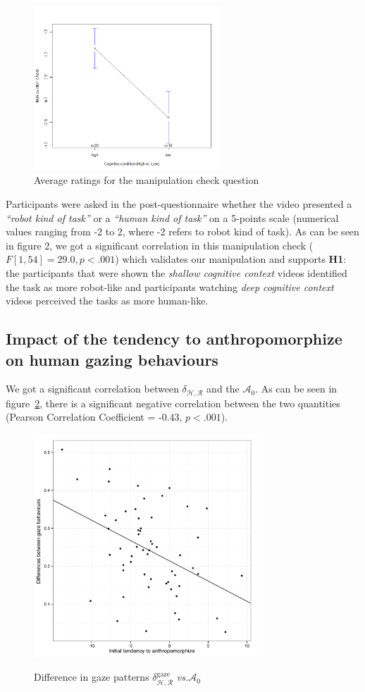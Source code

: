 \documentclass[lettersize, noapacite, twoside, HRI]{apa_HRI}
\newcommand{\vs}{\textit{vs.}\xspace}
\newcommand{\h}[1]{\textbf{H#1}\xspace}
\newcommand{\anti}{{$\mathcal{A}_0$\xspace}}
\begin{document}
\begin{figure}
    \centering
    \includegraphics[width=7cm]{ManipulationCheck}
    \caption{Average ratings for the manipulation check question}
    \label{fig:ManipulationCheck}
\end{figure}


Participants were asked in the post-questionnaire whether the video presented a
\emph{``robot kind of task''} or a \emph{``human kind of task''} on a 5-points
scale (numerical values ranging from -2 to 2, where -2 refers to robot kind of
task). As can be seen in figure 2, we got a significant correlation in this
manipulation check ($F[1,54] = 29.0, p < .001$) which validates our manipulation
and supports \h{1}: the participants that were shown the \emph{shallow cognitive
context} videos identified the task as more robot-like and participants watching
\emph{deep cognitive context} videos perceived the tasks as more human-like. 


\subsection{Impact of the tendency to anthropomorphize on human
gazing behaviours}

We got a significant correlation between $\delta_{\mathcal{H},\mathcal{R}}$ and
the \anti. As can be seen in figure~\ref{h2}, there is a significant negative
correlation between the two quantities (Pearson Correlation Coefficient = -0.43,
$p < .001$).

\begin{figure}
    \centering
    \includegraphics[width=3.3in]{H2}\label{GazeDifference-vs-ICA}
    \caption{Difference in gaze patterns $\delta_{\mathcal{H},
    \mathcal{R}}^{\text{gaze}}$ \vs \anti}
    \label{h2}
\end{figure}
\end{document}
